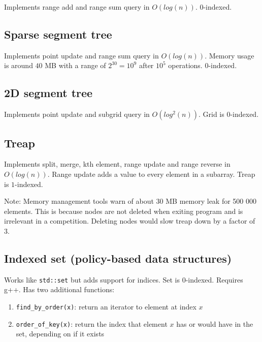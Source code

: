\documentclass{article}
\begin{document}
Implements range add and range sum query in $O(log(n))$. $0$-indexed.



\subsection {Sparse segment tree}

Implements point update and range sum query in $O(log (n))$. Memory usage is around $40$ MB with a range of $2^{30} = 10^9$ after $10^5$ operations. $0$-indexed.



\subsection {2D segment tree}

Implements point update and subgrid query in $O(log^2(n))$. Grid is $0$-indexed.



\subsection {Treap}

Implements split, merge, kth element, range update and range reverse in $O(log(n))$. Range update adds a value to every element in a subarray. Treap is $1$-indexed.

Note: Memory management tools warn of about 30 MB memory leak for 500 000 elements. This is because nodes are not deleted when exiting program and is irrelevant in a competition. Deleting nodes would slow treap down by a factor of 3.



\subsection {Indexed set (policy-based data structures)}

Works like \texttt{std::set} but adds support for indices. Set is 0-indexed. Requires g++. Has two additional functions:

\begin{enumerate}
	\item \verb|find_by_order(x)|: return an iterator to element at index $x$
	\item \verb|order_of_key(x)|: return the index that element $x$ has or would have in the set, depending on if it exists
\end{enumerate}
\end{document}
